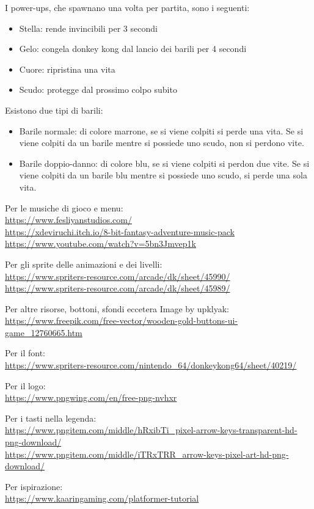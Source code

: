\documentclass[a4paper,12pt]{report}
\begin{document}
I power-ups, che spawnano una volta per partita, sono i seguenti:
\begin{itemize}
    \item Stella: rende invincibili per 3 secondi
    \item Gelo: congela donkey kong dal lancio dei barili per 4 secondi
    \item Cuore: ripristina una vita
    \item Scudo: protegge dal prossimo colpo subito
\end{itemize}

Esistono due tipi di barili:
\begin{itemize}
    \item Barile normale: di colore marrone, se si viene colpiti si perde una vita. Se si viene colpiti da un barile mentre si possiede uno scudo, non si perdono vite.
    \item Barile doppio-danno: di colore blu, se si viene colpiti si perdon due vite. Se si viene colpiti da un barile blu mentre si possiede uno scudo, si perde una sola vita.
\end{itemize}

\begin{thebibliography}{}
    Per le musiche di gioco e menu:
    \\\url{https://www.fesliyanstudios.com/}
    \\\url{https://xdeviruchi.itch.io/8-bit-fantasy-adventure-music-pack}
    \\\url{https://www.youtube.com/watch?v=5bn3Jmvep1k}

    Per gli sprite delle animazioni e dei livelli:
    \\\url{https://www.spriters-resource.com/arcade/dk/sheet/45990/}
    \\\url{https://www.spriters-resource.com/arcade/dk/sheet/45989/}

    Per altre risorse, bottoni, sfondi eccetera Image by upklyak:
    \\\url{https://www.freepik.com/free-vector/wooden-gold-buttons-ui-game_12760665.htm}

    Per il font:
    \\\url{https://www.spriters-resource.com/nintendo_64/donkeykong64/sheet/40219/}

    Per il logo:
    \\\url{https://www.pngwing.com/en/free-png-nvhxr}

    Per i tasti nella legenda:
    \\\url{https://www.pngitem.com/middle/hRxibTi_pixel-arrow-keys-transparent-hd-png-download/}
    \\\url{https://www.pngitem.com/middle/iTRxTRR_arrow-keys-pixel-art-hd-png-download/}

    Per ispirazione:
    \\\url{https://www.kaaringaming.com/platformer-tutorial}

\end{thebibliography}
\end{document}
